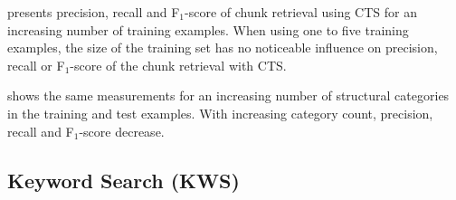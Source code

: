  presents precision,
recall and F$_{1}$-score of chunk retrieval using CTS for an
increasing number of training examples.
When using one to five
training examples, the size of the training set has no noticeable
influence on precision, recall or F$_{1}$-score of the chunk retrieval
with CTS.

 shows the same
measurements for an increasing number of structural categories in the
training and test examples.
With increasing category count, precision,
recall and F$_{1}$-score decrease.

\subsection{Keyword Search (KWS)}
\label{sec:r:kws}
